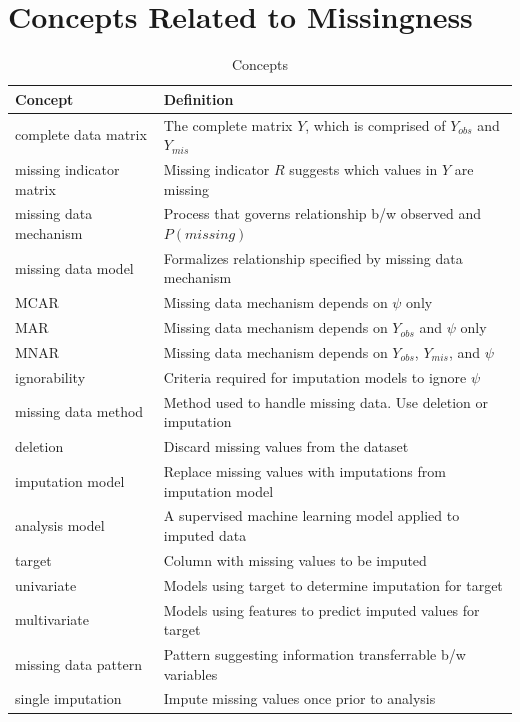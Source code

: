 \documentclass[12pt,oneside]{chicagocapstone}
\begin{document}
\chapter{Concepts Related to
Missingness}\label{concepts-related-to-missingness}
\begin{longtabu} to 
\caption{\label{tab:appendixdconcepts}Concepts}\\
\toprule
\begingroup\fontsize{13}{15}\selectfont \textbf{Concept}\endgroup & \begingroup\fontsize{13}{15}\selectfont \textbf{Definition}\endgroup\\
\midrule
complete data matrix & The complete matrix $Y$, which is comprised of $Y_{obs}$ and $Y_{mis}$\\
missing indicator matrix & Missing indicator $R$ suggests which values in $Y$ are missing\\
missing data mechanism & Process that governs relationship b/w observed and $P(missing)$\\
missing data model & Formalizes relationship specified by missing data mechanism\\
MCAR & Missing data mechanism depends on $\psi$ only\\
\addlinespace
MAR & Missing data mechanism depends on $Y_{obs}$ and $\psi$ only\\
MNAR & Missing data mechanism depends on $Y_{obs}$, $Y_{mis}$, and $\psi$\\
ignorability & Criteria required for imputation models to ignore $\psi$\\
missing data method & Method used to handle missing data. Use deletion or imputation\\
deletion & Discard missing values from the dataset\\
\addlinespace
imputation model & Replace missing values with imputations from imputation model\\
analysis model & A supervised machine learning model applied to imputed data\\
target & Column with missing values to be imputed\\
univariate & Models using target to determine imputation for target\\
multivariate & Models using features to predict imputed values for target\\
\addlinespace
missing data pattern & Pattern suggesting information transferrable b/w variables\\
single imputation & Impute missing values once prior to analysis\\

\end{longtabu}
\end{document}
